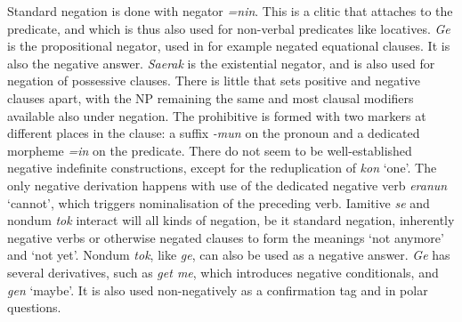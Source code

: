 \documentclass[output=paper,colorlinks,citecolor=brown,draft]{langscibook}
\begin{document}
Standard negation is done with negator \textit{=nin}. This is a clitic that attaches to the predicate, and which is thus also used for non-verbal predicates like locatives. \textit{Ge} is the propositional negator, used in for example negated equational clauses. It is also the negative answer. \textit{Saerak} is the existential negator, and is also used for negation of possessive clauses. There is little that sets positive and negative clauses apart, with the NP remaining the same and most clausal modifiers available also under negation. The prohibitive is formed with two markers at different places in the clause: a suffix \textit{-mun} on the pronoun and a dedicated morpheme \textit{=in} on the predicate. There do not seem to be well-established negative indefinite constructions, except for the reduplication of \textit{kon} `one'. The only negative derivation happens with use of the dedicated negative verb \textit{eranun} `cannot', which triggers nominalisation of the preceding verb. Iamitive \textit{se} and nondum \textit{tok} interact will all kinds of negation, be it standard negation, inherently negative verbs or otherwise negated clauses to form the meanings `not anymore' and `not yet'. Nondum \textit{tok}, like \textit{ge}, can also be used as a negative answer. \textit{Ge} has several derivatives, such as \textit{get me}, which introduces negative conditionals, and \textit{gen} `maybe'. It is also used non-negatively as a confirmation tag and in polar questions.
\end{document}
